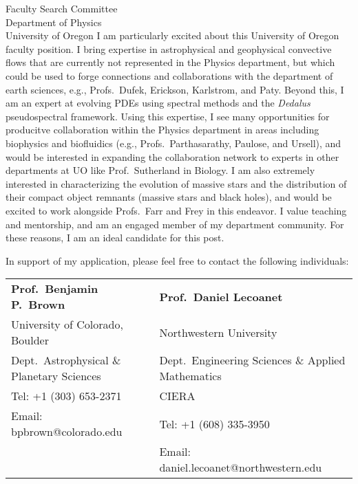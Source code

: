 \documentclass[11pt]{letter}
\begin{document}
\begin{letter}{
               Faculty Search Committee \\
               Department of Physics \\
               University of Oregon
           }
    I am particularly excited about this University of Oregon faculty position.
    I bring expertise in astrophysical and geophysical convective flows that are currently not represented in the Physics department, but which could be used to forge connections and collaborations with the department of earth sciences, e.g., Profs.~Dufek, Erickson, Karlstrom, and Paty.
    Beyond this, I am an expert at evolving PDEs using spectral methods and the \emph{Dedalus} pseudospectral framework.
    Using this expertise, I see many opportunities for producitve collaboration within the Physics department in areas including biophysics and biofluidics (e.g., Profs.~Parthasarathy, Paulose, and Ursell), and would be interested in expanding the collaboration network to experts in other departments at UO like Prof.~Sutherland in Biology.
    I am also extremely interested in characterizing the evolution of massive stars and the distribution of their compact object remnants (massive stars and black holes), and would be excited to work alongside Profs.~Farr and Frey in this endeavor.
    I value teaching and mentorship, and am an engaged member of my department community.
    For these reasons, I am an ideal candidate for this post.

    In support of my application, please feel free to contact the following individuals:

    \footnotesize
    \begin{tabular}{ll}
        \textbf{Prof.~Benjamin P.~Brown}                        &\hspace{0.25in} \textbf{Prof.~Daniel Lecoanet}                     \\
        University of Colorado, Boulder                         &\hspace{0.25in} Northwestern University    \\
        \hspace{0.2in}Dept.~Astrophysical \& Planetary Sciences &\hspace{0.45in} Dept.~Engineering Sciences \& Applied Mathematics \\
        Tel: +1 (303) 653-2371                                    &\hspace{0.45in} CIERA                          \\
        Email: bpbrown@colorado.edu                             &\hspace{0.25in} Tel: +1 (608) 335-3950 \\
                                                                &\hspace{0.25in} Email: daniel.lecoanet@northwestern.edu             \\


\end{tabular}
\end{letter}
\end{document}
